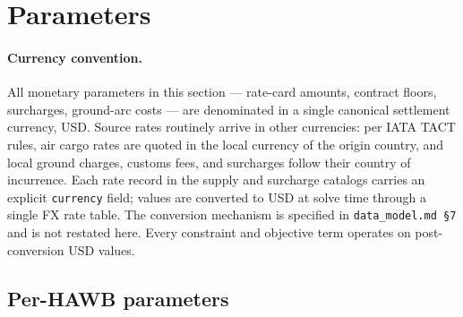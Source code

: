 \documentclass[11pt,a4paper]{article}
\theoremstyle{definition}
\begin{document}
\section{Parameters}
\label{sec:parameters}

\paragraph{Currency convention.}
All monetary parameters in this section --- rate-card amounts, contract
floors, surcharges, ground-arc costs --- are denominated in a single canonical
settlement currency, USD. Source rates routinely arrive in other currencies:
per IATA TACT rules, air cargo rates are quoted in the local currency of the
origin country, and local ground charges, customs fees, and surcharges follow
their country of incurrence. Each rate record in the supply and surcharge
catalogs carries an explicit \texttt{currency} field; values are converted to
USD at solve time through a single FX rate table. The conversion mechanism is
specified in \texttt{data\_model.md~\S7} and is not restated here. Every
constraint and objective term operates on post-conversion USD values.

\subsection{Per-HAWB parameters}
\label{sec:hawb-params}
\end{document}
